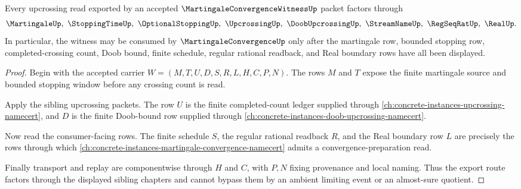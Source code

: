 \begin{theorem}
\label{thm:martingale-convergence-witness-upcrossing-factorization}
Every upcrossing read exported by an accepted $\MartingaleConvergenceWitnessUp$ packet factors through
$$
\MartingaleUp,\ \StoppingTimeUp,\ \OptionalStoppingUp,\ \UpcrossingUp,\ \DoobUpcrossingUp,\ \StreamNameUp,\ \RegSeqRatUp,\ \RealUp .
$$
In particular, the witness may be consumed by $\MartingaleConvergenceUp$ only after the martingale row, bounded stopping row, completed-crossing count, Doob bound, finite schedule, regular rational readback, and Real boundary rows have all been displayed.
\end{theorem}
\begin{proof}
Begin with the accepted carrier $W=(M,T,U,D,S,R,L,H,C,P,N)$. The rows $M$ and $T$ expose the finite martingale source and bounded stopping window before any crossing count is read.

Apply the sibling upcrossing packets. The row $U$ is the finite completed-count ledger supplied through \autoref{ch:concrete-instances-upcrossing-namecert}, and $D$ is the finite Doob-bound row supplied through \autoref{ch:concrete-instances-doob-upcrossing-namecert}.

Now read the consumer-facing rows. The finite schedule $S$, the regular rational readback $R$, and the Real boundary row $L$ are precisely the rows through which \autoref{ch:concrete-instances-martingale-convergence-namecert} admits a convergence-preparation read.

Finally transport and replay are componentwise through $H$ and $C$, with $P,N$ fixing provenance and local naming. Thus the export route factors through the displayed sibling chapters and cannot bypass them by an ambient limiting event or an almost-sure quotient.
\end{proof}

